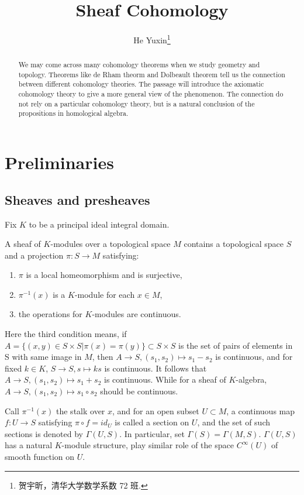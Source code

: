 \documentclass[twoside]{article}
\begin{document}
\title{Sheaf  Cohomology}
\author{He Yuxin\footnote{贺宇昕，清华大学数学系数 72 班.}}


\begin{abstract}
    We may come across many cohomology theorems  when we study geometry and topology. Theorems like de Rham theorm and Dolbeault theorem tell us the connection between different cohomology theories. The passage will introduce the axiomatic cohomology theory to  give a more general view of the phenomenon. The connection do not rely on a particular cohomology theory,  but is a natural conclusion of the propositions in homological algebra.
\end{abstract}

\tableofcontents
\section{Preliminaries}
\subsection{Sheaves and presheaves}

Fix $K$ to be a principal  ideal  integral domain.

 \begin{definition}
   A sheaf of $K$-modules over a topological space $M$ contains a topological space $S$ and a projection  $\pi:S\to M$ satisfying:
   \begin{enumerate}
     \item $\pi$ is a local homeomorphism and is surjective,
     \item $\pi^{-1}(x)$ is a $K$-module for each $x\in M$,
     \item the  operations for $K$-modules are continuous.
   \end{enumerate}
 \end{definition}
Here the third condition means, if  $A=\{(x,y)\in S\times S|\pi(x)=\pi(y)\}\subset S\times S$ is the set of pairs of elements in S with same image in $M$, then $A\to S,(s_1,s_2)\mapsto s_1-s_2$ is continuous, and for fixed $k\in K$, $S\to S, s\mapsto ks$ is continuous. It follows that $A\to S,(s_1,s_2)\mapsto s_1+s_2$ is continuous.  While for a sheaf of $K$-algebra,  $A\to S,(s_1,s_2)\mapsto s_1\circ s_2$ should be continuous.

Call $\pi^{-1}(x)$ the stalk over $x$, and for an open subset $U\subset M$, a continuous map $f:U\to S$ satisfying $\pi\circ f=id_U$ is called a section on $U$, and the set of such sections is denoted by $\Gamma(U,S)$. In particular, set $\Gamma(S)=\Gamma(M,S)$. $\Gamma(U,S)$ has a  natural $K$-module structure, play similar role of the space $C^\infty(U)$ of smooth function on $U$.
\end{document}
